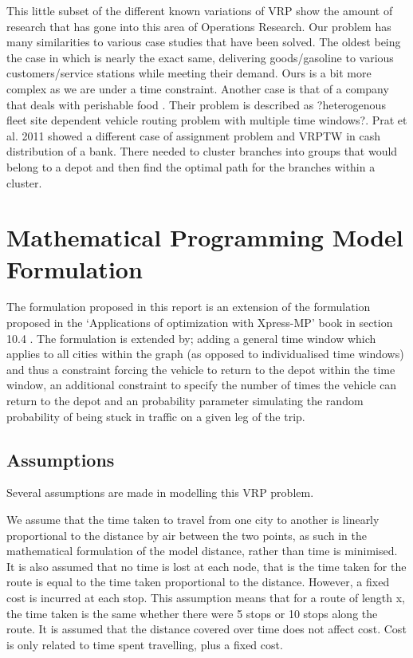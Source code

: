 \documentclass[a4paper,11pt]{article}
\begin{document}
This little subset of the different known variations of VRP show the amount of research that has gone into this area of Operations Research. Our problem has many similarities to various case studies that have been solved. The oldest being the case in \cite{dantzig1959truck}  which is nearly the exact same, delivering goods/gasoline to various customers/service stations while meeting their demand. Ours is a bit more complex as we are under a time constraint. Another case is that of a company that deals with perishable food \cite{amorim2014rich}. Their problem is described as ?heterogenous fleet site dependent vehicle routing problem with multiple time windows?. Prat et al. 2011 \cite{boonsam2011assignment}showed a different case of assignment problem and VRPTW in cash distribution of a bank. There needed to cluster branches into groups that would belong to a depot and then find the optimal path for the branches within a cluster.






\section{Mathematical Programming Model Formulation}

The formulation proposed in this report is an extension of the formulation proposed in the `Applications of optimization with Xpress-MP' book in section 10.4 \cite{gueret1999applications}. The formulation is extended by; adding a general time window which applies to all cities within the graph (as opposed to individualised time windows) and thus a constraint forcing the vehicle to return to the depot within the time window, an additional constraint to specify the number of times the vehicle can return to the depot and an probability parameter simulating the random probability of being stuck in traffic on a given leg of the trip.

\subsection{Assumptions}
Several assumptions are made in modelling this VRP problem.

We assume that the time taken to travel from one city to another is linearly proportional to the distance by air between the two points, as such in the mathematical formulation of the model distance, rather than time is minimised. It is also assumed that no time is lost at each node, that is the time taken for the route is equal to the time taken proportional to the distance. However, a fixed cost is incurred at each stop. This assumption means that for a route of length x, the time taken is the same whether there were 5 stops or 10 stops along the route. It is assumed that the distance covered over time does not affect cost. Cost is only related to time spent travelling, plus a fixed cost.
\end{document}
